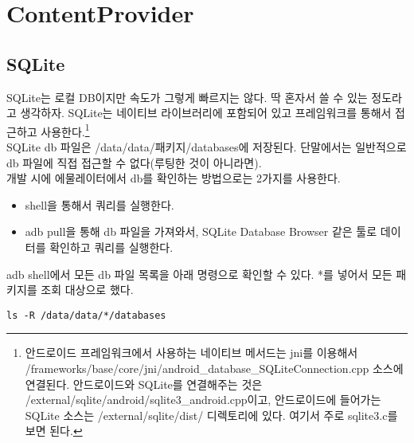 \chapter{ContentProvider}
\section{SQLite}
SQLite는 로컬 DB이지만 속도가 그렇게 빠르지는 않다. 딱 혼자서 쓸 수 있는 정도라고 생각하자.
SQLite는 네이티브 라이브러리에 포함되어 있고 프레임워크를 통해서 접근하고 사용한다.\footnote{안드로이드 프레임워크에서 사용하는 네이티브 메서드는 jni를 이용해서 /frameworks/base/core/jni/android\_database\_SQLiteConnection.cpp 소스에 연결된다.
안드로이드와 SQLite를 연결해주는 것은 /external/sqlite/android/sqlite3\_android.cpp이고,
안드로이드에 들어가는 SQLite 소스는 /external/sqlite/dist/ 디렉토리에 있다. 여기서 주로 sqlite3.c를 보면 된다.}\\

SQLite db 파일은 /data/data/패키지/databases에 저장된다. 
단말에서는 일반적으로 db 파일에 직접 접근할 수 없다(루팅한 것이 아니라면).\\

개발 시에 에물레이터에서 db를 확인하는 방법으로는 2가지를 사용한다.
\begin{itemize}
\item shell을 통해서 쿼리를 실행한다.
\item adb pull을 통해 db 파일을 가져와서, SQLite Database Browser 같은 툴로 데이터를 확인하고 쿼리를 실행한다.
\end{itemize}

adb shell에서 모든 db 파일 목록을 아래 명령으로 확인할 수 있다. *를 넣어서 모든 패키지를 조회 대상으로 했다. 
\begin{lstlisting}[frame=single]
 ls -R /data/data/*/databases 
\end{lstlisting}

